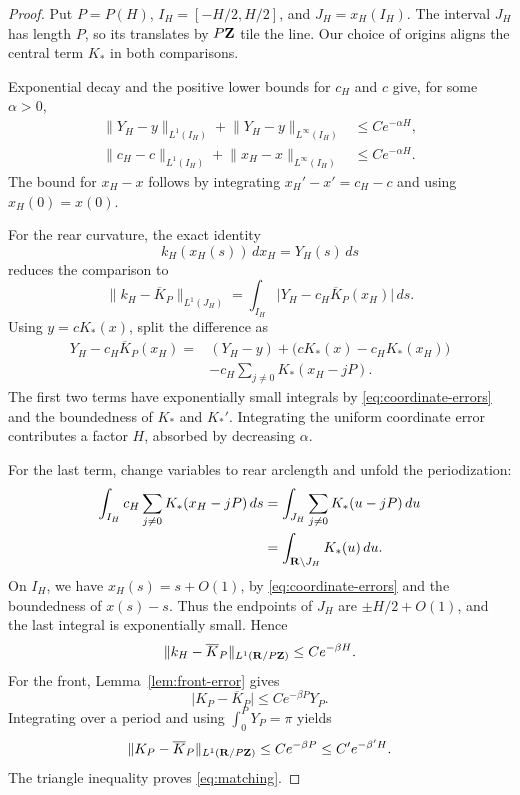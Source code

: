 \documentclass[11pt]{article}
\numberwithin{equation}{section}
\newcommand{\R}{{\bf R}}
\newcommand{\Z}{{\bf Z}}
\newcommand{\abs}[1]{\lvert #1\rvert}
\newcommand{\norm}[1]{\lVert #1\rVert}
\begin{document}
\begin{proof}
Put \(P=P(H)\), \(I_H=[-H/2,H/2]\), and \(J_H=x_H(I_H)\). The interval
\(J_H\) has length \(P\), so its translates by \(P\Z\) tile the
line. Our choice of origins aligns the central term \(K_*\) in both comparisons.

Exponential decay and the positive lower bounds for \(c_H\) and \(c\)
give, for some \(\alpha>0\),
\begin{equation}\label{eq:coordinate-errors}
\begin{aligned}
  \norm{Y_H-y}_{L^1(I_H)}+\norm{Y_H-y}_{L^\infty(I_H)}
    &\leq Ce^{-\alpha H},\\
  \norm{c_H-c}_{L^1(I_H)}+\norm{x_H-x}_{L^\infty(I_H)}
    &\leq Ce^{-\alpha H}.
\end{aligned}
\end{equation}
The bound for \(x_H-x\) follows by integrating \(x_H'-x'=c_H-c\) and
using \(x_H(0)=x(0)\).

For the rear curvature, the exact identity
\begin{equation}\label{eq:rear-measure}
  k_H(x_H(s))\,dx_H=Y_H(s)\,ds
\end{equation}
reduces the comparison to
\[
  \norm{k_H-\overline K_P}_{L^1(J_H)}
   =\int_{I_H}\abs{Y_H-c_H\overline K_P(x_H)}\,ds.
\]
Using \(y=cK_*(x)\), split the difference as
\begin{align*}
  Y_H-c_H\overline K_P(x_H)
  ={}&(Y_H-y)+\bigl(cK_*(x)-c_HK_*(x_H)\bigr)\\
     &-c_H\sum_{j\ne0}K_*(x_H-jP).
\end{align*}
The first two terms have exponentially small integrals by
\eqref{eq:coordinate-errors} and the boundedness of \(K_*\) and \(K_*'\).
Integrating the uniform coordinate error contributes a factor \(H\),
absorbed by decreasing \(\alpha\).

For the last term, change variables to rear arclength and unfold the
periodization:
\begin{align*}
  \int_{I_H}c_H\sum_{j\ne0}K_*(x_H-jP)\,ds
  &=\int_{J_H}\sum_{j\ne0}K_*(u-jP)\,du\\
  &=\int_{\R\setminus J_H}K_*(u)\,du.
\end{align*}
On \(I_H\), we have \(x_H(s)=s+O(1)\), by
\eqref{eq:coordinate-errors} and the boundedness of \(x(s)-s\). Thus the
endpoints of \(J_H\) are \(\pm H/2+O(1)\), and the last integral is
exponentially small. Hence
\begin{equation}\label{eq:rear-common}
  \norm{k_H-\overline K_P}_{L^1(\R/P\Z)}\leq Ce^{-\beta H}.
\end{equation}
For the front, Lemma~\ref{lem:front-error} gives
\[
  \abs{K_P-\overline K_P}\leq Ce^{-\beta P}Y_P.
\]
Integrating over a period and using \(\int_0^P Y_P=\pi\) yields
\begin{equation}\label{eq:front-common}
  \norm{K_P-\overline K_P}_{L^1(\R/P\Z)}
  \leq Ce^{-\beta P}\leq C'e^{-\beta'H}.
\end{equation}
The triangle inequality proves \eqref{eq:matching}.
\end{proof}
\end{document}
